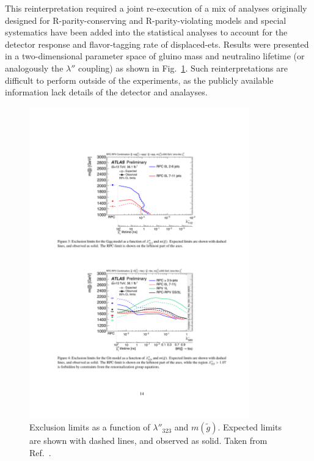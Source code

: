 This reinterpretation required a joint re-execution of a mix of analyses originally designed for R-parity-conserving and R-parity-violating models and special systematics have been added into the statistical analyses to account for the detector response and flavor-tagging rate of displaced-ets. Results were presented in a two-dimensional parameter space of gluino mass and neutralino lifetime (or analogously the $\lambda''$ coupling) as shown in Fig.~\ref{fig:rpvrpc}. Such reinterpretations are difficult to perform outside of the experiments, as the publicly available information lack details of the detector and analayses.

\begin{figure}[h]
\begin{center}
\includegraphics[width=0.85\textwidth,angle=0]{ch5-figures/fig_04.pdf}
\end{center}
\caption{Exclusion limits as a function of $\lambda''_{323}$ and $m({\tilde{g}})$. Expected limits are shown with dashed lines, and observed as solid. Taken from Ref.~\cite{ATLAS-CONF-2018-003}.}
\label{fig:rpvrpc}
\end{figure}



